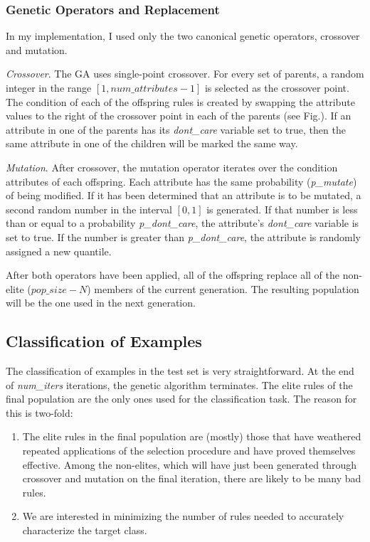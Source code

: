 \documentclass[11pt]{article}
\begin{document}
\subsubsection*{Genetic Operators and Replacement}

In my implementation, I used only the two canonical genetic operators, crossover and mutation.

\emph{Crossover}. The GA uses single-point crossover. For every set of parents, a random integer in the range $[1, num\_attributes - 1]$ is selected as the crossover point. The condition of each of the offspring rules is created by swapping the attribute values to the right of the crossover point in each of the parents (see Fig.). If an attribute in one of the parents has its \emph{dont\_care} variable set to true, then the same attribute in one of the children will be marked the same way.

\emph{Mutation}. After crossover, the mutation operator iterates over the condition attributes of each offspring. Each attribute has the same probability (\emph{p\_mutate}) of being modified. If it has been determined that an attribute is to be mutated, a second random number in the interval $[0,1]$ is generated. If that number is less than or equal to a probability \emph{p\_dont\_care}, the attribute's \emph{dont\_care} variable is set to true. If the number is greater than \emph{p\_dont\_care}, the attribute is randomly assigned a new quantile.

After both operators have been applied, all of the offspring replace all of the non-elite ($pop\_size - N$) members of the current generation. The resulting population will be the one used in the next generation.

\subsection{Classification of Examples}

The classification of examples in the test set is very straightforward. At the end of \textit{num\_iters} iterations, the genetic algorithm terminates. The elite rules of the final population are the only ones used for the classification task. The reason for this is two-fold:
\begin{enumerate}
\item The elite rules in the final population are (mostly) those that have weathered repeated applications of the selection procedure and have proved themselves effective. Among the non-elites, which will have just been generated through crossover and mutation on the final iteration, there are likely to be many bad rules.
\item We are interested in minimizing the number of rules needed to accurately characterize the target class.
\end{enumerate}
\end{document}
